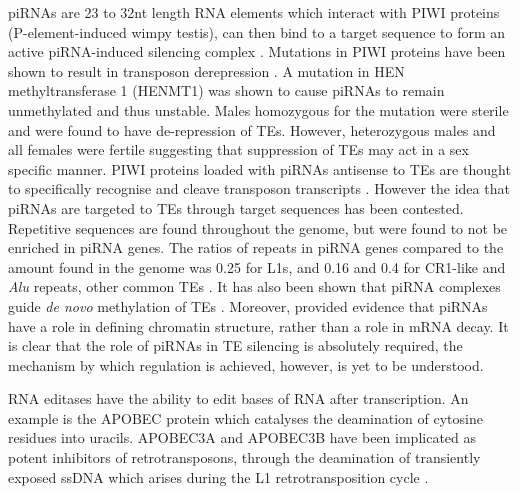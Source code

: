 \documentclass[12pt]{article}
\begin{document}
			piRNAs are 23 to 32nt length RNA elements which interact with PIWI proteins (P-element-induced wimpy testis), can then bind to a target sequence to form an active piRNA-induced silencing complex \citep{Castaneda11, Siomi11, Bodak14, Lim15}.
			Mutations in PIWI proteins have been shown to result in transposon derepression \citep{Vagin04,Kalmykova05}.
			A mutation in HEN methyltransferase 1 (HENMT1) was shown to cause piRNAs to remain unmethylated and thus unstable.
			Males homozygous for the mutation were sterile  and were found to have de-repression of TEs. 
			However, heterozygous males and all females were fertile \citep{Lim15} suggesting that suppression of TEs may act in a sex specific manner. 
			PIWI proteins loaded with piRNAs antisense to TEs are thought to specifically recognise and cleave transposon transcripts \citep{Brennecke07,Gunawardane07}. 
			However the idea that piRNAs are targeted to TEs through target sequences has been contested.
			Repetitive sequences are found throughout the genome, but were found to not be enriched in piRNA genes.
			The ratios of repeats in piRNA genes compared to the amount found in the genome was 0.25 for L1s, and 0.16 and 0.4 for CR1-like and \textit{Alu} repeats, other common TEs \citep{Williams15}.
			It has also been shown that piRNA complexes guide \textit{de novo} methylation of TEs \citep{Aravin07,Kuramochi08}.
			Moreover, \citet{Lim15} provided evidence that piRNAs have a role in defining chromatin structure, rather than a role in mRNA decay. 
			It is clear that the role of piRNAs in TE silencing is absolutely required, the mechanism by which regulation is achieved, however, is yet to be understood.
			
			RNA editases have the ability to edit bases of RNA after transcription. 
			An example is the APOBEC protein which catalyses the deamination of cytosine residues into uracils.
			APOBEC3A and APOBEC3B have been implicated as potent inhibitors of retrotransposons, through the deamination of transiently exposed ssDNA which arises during the L1 retrotransposition cycle \citep{Bogerd06, Richardson14}. 
			
\end{document}
